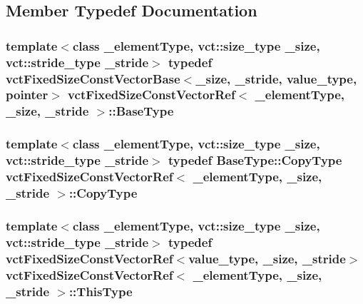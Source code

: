 \subsection{Member Typedef Documentation}
\hypertarget{classvct_fixed_size_const_vector_ref_a669fc6db8058bda695431756ce54f59d}{
\subsubsection[{Base\-Type}]{\setlength{\rightskip}{0pt plus 5cm}template$<$class \-\_\-element\-Type, vct\-::size\-\_\-type \-\_\-size, vct\-::stride\-\_\-type \-\_\-stride$>$ typedef {\bf vct\-Fixed\-Size\-Const\-Vector\-Base}$<$\-\_\-size, \-\_\-stride, value\-\_\-type, pointer$>$ {\bf vct\-Fixed\-Size\-Const\-Vector\-Ref}$<$ \-\_\-element\-Type, \-\_\-size, \-\_\-stride $>$\-::{\bf Base\-Type}}}\label{classvct_fixed_size_const_vector_ref_a669fc6db8058bda695431756ce54f59d}
\hypertarget{classvct_fixed_size_const_vector_ref_a14ea8a2cf943f5a4f5f9d2def5ce48de}{
\subsubsection[{Copy\-Type}]{\setlength{\rightskip}{0pt plus 5cm}template$<$class \-\_\-element\-Type, vct\-::size\-\_\-type \-\_\-size, vct\-::stride\-\_\-type \-\_\-stride$>$ typedef {\bf Base\-Type\-::\-Copy\-Type} {\bf vct\-Fixed\-Size\-Const\-Vector\-Ref}$<$ \-\_\-element\-Type, \-\_\-size, \-\_\-stride $>$\-::{\bf Copy\-Type}}}\label{classvct_fixed_size_const_vector_ref_a14ea8a2cf943f5a4f5f9d2def5ce48de}
\hypertarget{classvct_fixed_size_const_vector_ref_a21e7349968a7377aaeacacf7803e05e6}{
\subsubsection[{This\-Type}]{\setlength{\rightskip}{0pt plus 5cm}template$<$class \-\_\-element\-Type, vct\-::size\-\_\-type \-\_\-size, vct\-::stride\-\_\-type \-\_\-stride$>$ typedef {\bf vct\-Fixed\-Size\-Const\-Vector\-Ref}$<$value\-\_\-type, \-\_\-size, \-\_\-stride$>$ {\bf vct\-Fixed\-Size\-Const\-Vector\-Ref}$<$ \-\_\-element\-Type, \-\_\-size, \-\_\-stride $>$\-::{\bf This\-Type}}}\label{classvct_fixed_size_const_vector_ref_a21e7349968a7377aaeacacf7803e05e6}
